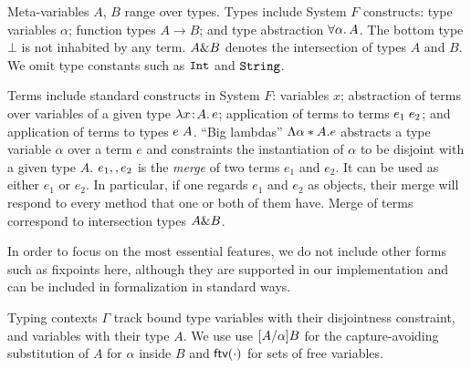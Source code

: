 
Meta-variables $A$, $B$ range over types. Types include System $F$ constructs:
type variables $\alpha$; function types $A \to B$; and type
abstraction $\forall \alpha. \, A$. The bottom type $\bot$ is not inhabited by any
term. $A \& B$ denotes the intersection of types $A$ and
$B$. We omit type constants such as $\texttt {Int}$ and $\texttt {String}$.

Terms include standard constructs in System $F$: variables $x$; abstraction of
terms over variables of a given type $\lambda x \!:\! A.\, e$; application of terms to
terms $e_1 \; e_2$; and application of terms to types $e \; A$.
``Big lambdas'' $\Lambda \alpha * A. e$ abstracts a type variable
$\alpha$ over a term $e$ and constraints the instantiation of $\alpha$ to be
disjoint with a given type $A$. $e_1 ,, e_2$ is the \emph{merge} of two
terms $e_1$ and $e_2$. It can be used as either $ e_1 $ or $ e_2 $. In
particular, if one regards $e_1$ and $e_2$ as objects, their merge will respond
to every method that one or both of them have. Merge of terms correspond to
intersection types $A \& B$.


In order to focus on the most essential features, we do not include other forms
such as fixpoints here, although they are supported in our implementation and
can be included in formalization in standard ways.

Typing contexts $ \Gamma $ track bound type variables with their disjointness
constraint, and variables with their type $A$. We use use $\lbrack A / \alpha \rbrack
{B}$ for the capture-avoiding substitution of $A$ for $\alpha$ inside $B$ and
$\textsf{ftv}(\cdot)$ for sets of free variables.


